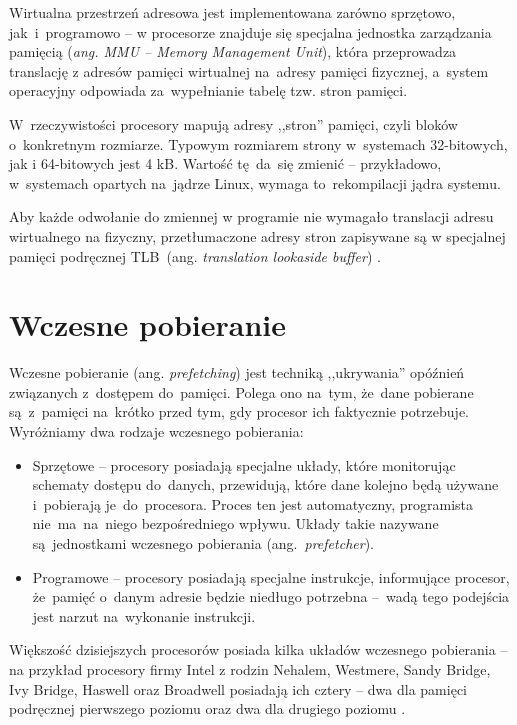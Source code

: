 Wirtualna przestrzeń adresowa jest implementowana zarówno sprzętowo, jak~i~programowo -- w procesorze znajduje się specjalna jednostka zarządzania pamięcią (\textit{ang. MMU -- Memory Management Unit}), która przeprowadza translację z adresów pamięci wirtualnej na~adresy pamięci fizycznej, a~system operacyjny odpowiada za~wypełnianie tabelę tzw. stron pamięci.


W~rzeczywistości procesory mapują adresy ,,stron'' pamięci, czyli bloków o~konkretnym rozmiarze. Typowym rozmiarem strony w~systemach 32-bitowych, jak i 64-bitowych jest 4 kB. Wartość tę~da~się zmienić -- przykładowo, w~systemach opartych na~jądrze Linux, wymaga to~rekompilacji jądra systemu.

Aby każde odwołanie do zmiennej w programie nie wymagało translacji adresu wirtualnego na fizyczny, przetłumaczone adresy stron zapisywane są w specjalnej pamięci podręcznej TLB~(ang. \textit{translation lookaside buffer}) \cite{WhatEveryScientistShouldKnowAboutMemory}.

\section{Wczesne pobieranie}

Wczesne pobieranie (ang. \textit{prefetching}) jest techniką ,,ukrywania'' opóźnień związanych z~dostępem do~pamięci. Polega ono na~tym, że~dane pobierane są~z~pamięci na~krótko przed tym, gdy procesor ich faktycznie potrzebuje. Wyróżniamy dwa rodzaje wczesnego pobierania:

\begin{itemize}
	\item Sprzętowe -- procesory posiadają specjalne układy, które monitorując schematy dostępu do~danych, przewidują, które dane kolejno będą używane i~pobierają je~do~procesora. Proces ten jest automatyczny, programista nie~ma~na~niego bezpośredniego wpływu. Układy takie nazywane są~jednostkami wczesnego pobierania (ang.~\textit{prefetcher}).
	
	\item Programowe -- procesory posiadają specjalne instrukcje, informujące procesor, że~pamięć o~danym adresie będzie niedługo potrzebna --~wadą tego podejścia jest narzut na~wykonanie instrukcji.
\end{itemize}

Większość dzisiejszych procesorów posiada kilka układów wczesnego pobierania -- na przykład procesory firmy Intel z rodzin  Nehalem, Westmere, Sandy Bridge, Ivy Bridge, Haswell oraz Broadwell posiadają ich cztery -- dwa dla pamięci podręcznej pierwszego poziomu oraz dwa dla drugiego poziomu \cite{IntelHWPrefetchDisclosure, IntelOptimizationRefManual}.

